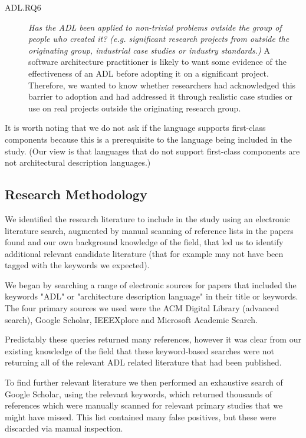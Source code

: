 \begin{description}
\item[ADL.RQ6] \emph{Has the ADL been applied to non-trivial problems outside the group of people who created it? (e.g. significant research projects from outside the originating group, industrial case studies or industry standards.)}  A software architecture practitioner is likely to want some evidence of the effectiveness of an ADL before adopting it on a significant project.  Therefore, we wanted to know whether researchers had acknowledged this barrier to adoption and had addressed it through realistic case studies or use on real projects outside the originating research group.

\end{description}

It is worth noting that we do not ask if the language supports first-class components because this is a prerequisite to the language being included in the study.  (Our view is that languages that do not support first-class components are not architectural description languages.) 

\subsection{Research Methodology}

We identified the research literature to include in the study using an electronic literature search, augmented by manual scanning of reference lists in the papers found and our own background knowledge of the field, that led us to identify additional relevant candidate literature (that for example may not have been tagged with the keywords we expected).

We began by searching a range of electronic sources for papers that included the keywords "ADL" or "architecture description language" in their title or keywords.  The four primary sources we used were the ACM Digital Library (advanced search), Google Scholar, IEEEXplore and Microsoft Academic Search.	

Predictably these queries returned many references, however it was clear from our existing knowledge of the field that these keyword-based searches were not returning all of the relevant ADL related literature that had been published.

To find further relevant literature we then performed an exhaustive search of Google Scholar, using the relevant keywords, which returned thousands of references which were manually scanned for relevant primary studies that we might have missed.  This list contained many false positives, but these were discarded via manual inspection. 

